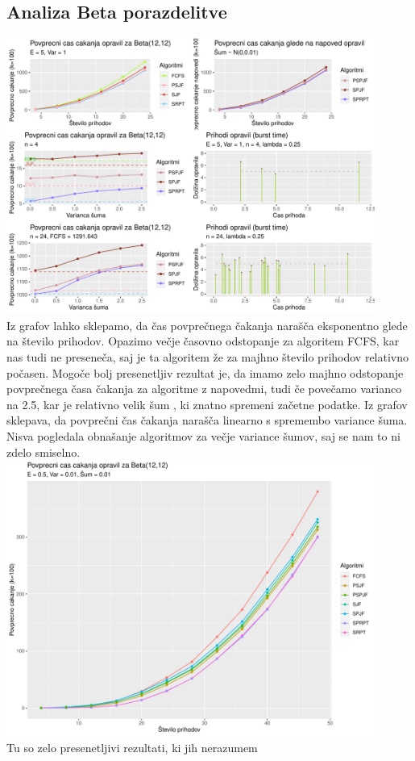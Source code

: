 \documentclass[a4paper, pt14]{article}
\begin{document}
\subsection{Analiza Beta porazdelitve}
\includegraphics[width=12.1cm,keepaspectratio]{Beta_grafi.pdf}
\\Iz grafov lahko sklepamo, da \v cas povpre\v cnega \v cakanja nara\v s\v ca eksponentno glede na \v stevilo prihodov. Opazimo ve\v cje \v casovno odstopanje za algoritem FCFS, kar nas tudi ne presene\v ca, saj je ta algoritem \v ze za majhno \v stevilo prihodov relativno po\v casen. Mogo\v ce bolj presenetljiv rezultat je, da imamo zelo majhno odstopanje povpre\v cnega \v casa \v cakanja za algoritme z napovedmi, tudi \v ce pove\v camo varianco na 2.5, kar je relativno velik \v sum , ki znatno spremeni za\v cetne podatke. Iz grafov sklepava, da povpre\v cni \v cas \v cakanja nara\v s\v ca linearno s spremembo variance \v suma. Nisva pogledala obna\v sanje algoritmov za ve\v cje variance \v sumov, saj se nam to ni zdelo smiselno.\\
\includegraphics[width=12.1cm,keepaspectratio]{Beta_grafi_majhna.pdf}
\\
Tu so zelo presenetljivi rezultati, ki jih nerazumem
\end{document}
